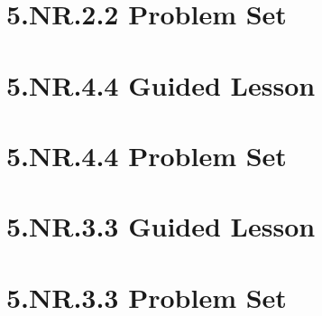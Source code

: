 \documentclass[a4paper,12pt]{article}
\begin{document}
\newpage
\section{5.NR.2.2 Problem Set}


\newpage
\section{5.NR.4.4 Guided Lesson}


\newpage
\section{5.NR.4.4 Problem Set}


\newpage
\section{5.NR.3.3 Guided Lesson}


\newpage
\section{5.NR.3.3 Problem Set}

\end{document}
